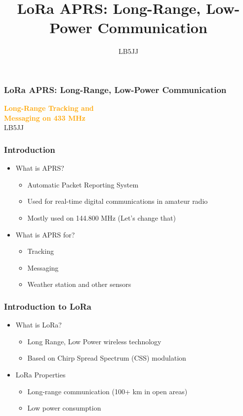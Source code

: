 \documentclass[aspectratio=169]{beamer}
\title[LoRa APRS: Long-Range, Low-Power Communication]{LoRa APRS: Long-Range, Low-Power Communication}
\author{LB5JJ}
\date{}
\begin{document}
\begin{frame}
  \frametitle{LoRa APRS: Long-Range, Low-Power Communication}
  \begin{center}
    {\Huge \textbf{\textcolor{orange}{Long-Range Tracking and\\Messaging on 433 MHz}}} \\[1cm]
    {\Large \textcolor{light}{LB5JJ}}
  \end{center}
\end{frame}

\begin{frame}[t]
  \frametitle{Introduction}
  \begin{itemize}
  \item What is APRS?
  \medskip
  \begin{itemize}
    \item Automatic Packet Reporting System
    \medskip
    \item Used for real-time digital communications in amateur radio
    \medskip
    \item Mostly used on 144.800 MHz (Let's change that)
    \end{itemize}
    \medskip
    \item What is APRS for?
    \medskip
    \begin{itemize}
      \item Tracking
      \medskip
      \item Messaging
      \medskip
      \item Weather station and other sensors
    \end{itemize}
  \end{itemize}
\end{frame}

\begin{frame}[t]
  \frametitle{Introduction to LoRa}
  \begin{itemize}
      \item What is LoRa?
      \medskip
      \begin{itemize}
        \item Long Range, Low Power wireless technology
        \medskip
        \item Based on Chirp Spread Spectrum (CSS) modulation
      \end{itemize}
      \medskip
      \item LoRa Properties
      \medskip
      \begin{itemize}
        \item Long-range communication (100+ km in open areas)
        \medskip
        \item Low power consumption
      \end{itemize}
    \end{itemize}
\end{frame}
\end{document}
